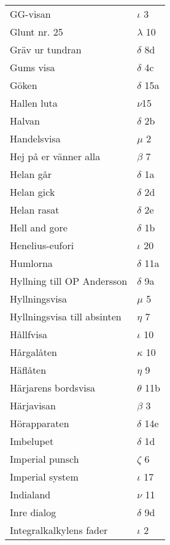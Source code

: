 \documentclass[a6paper,10pt]{article}
\begin{document}
\newpage
\setlength{\oddsidemargin}{-0.37in}
\begin{table}[!h]
\begin{tabular}{l l}
GG-visan&$\iota$ 3\\
Glunt nr. 25&$\lambda$ 10\\
Gräv ur tundran&$\delta$ 8d\\
Gums visa&$\delta$ 4c\\
Göken&$\delta$ 15a\\
Hallen luta&$\nu$15\\
Halvan&$\delta$ 2b\\
Handelsvisa&$\mu$ 2\\
Hej på er vänner alla&$\beta$ 7\\
Helan går&$\delta$ 1a\\
Helan gick&$\delta$ 2d\\
Helan rasat&$\delta$ 2e\\
Hell and gore&$\delta$ 1b\\
Henelius-eufori&$\iota$ 20\\
Humlorna&$\delta$ 11a\\
Hyllning till OP Andersson&$\delta$ 9a\\
Hyllningsvisa&$\mu$ 5\\
Hyllningsvisa till absinten&$\eta$ 7\\
Hållfvisa&$\iota$ 10\\
Hårgalåten&$\kappa$ 10\\
Häflåten&$\eta$ 9\\
Härjarens bordsvisa&$\theta$ 11b\\
Härjavisan&$\beta$ 3\\
Hörapparaten&$\delta$ 14e\\
Imbelupet&$\delta$ 1d\\
Imperial punsch&$\zeta$ 6\\
Imperial system&$\iota$ 17\\
Indialand&$\nu$ 11\\
Inre dialog&$\delta$ 9d\\
Integralkalkylens fader&$\iota$ 2\\
\end{tabular}
\end{table}
\end{document}
